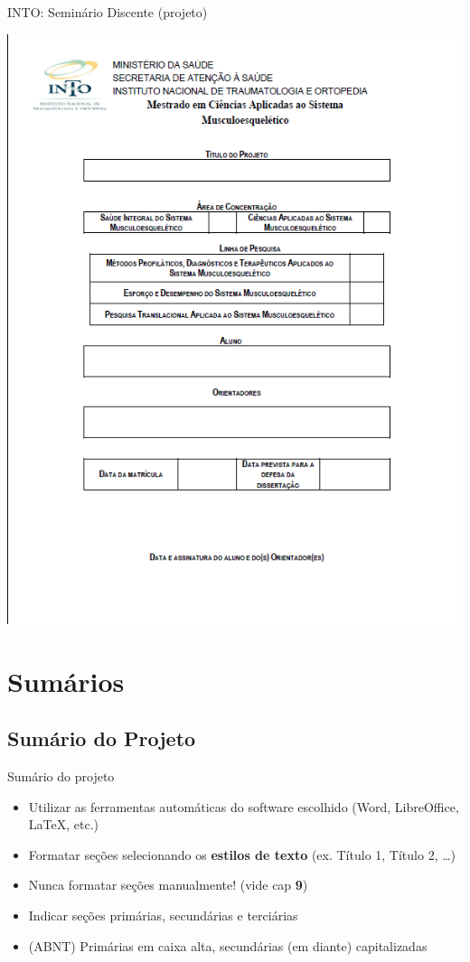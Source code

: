 \documentclass{beamer}
\begin{document}
\begin{frame}{INTO: Seminário Discente (projeto)}
  \begin{center}
    \includegraphics[height=\textheight]{ProjetoII/projeto}
  \end{center}
\end{frame}

\section{Sumários}

\subsection{Sumário do Projeto}

\begin{frame}{Sumário do projeto}
  \begin{itemize}
  \item Utilizar as ferramentas automáticas do software escolhido
    (Word, LibreOffice, \LaTeX, etc.)
  \item Formatar seções selecionando os {\bf estilos de texto}
    (ex. Título 1, Título 2, \ldots)
  \item \alert{Nunca} formatar seções manualmente! (vide cap {\bf 9})
  \item Indicar seções primárias, secundárias e terciárias
  \item (ABNT) Primárias em caixa alta, secundárias (em diante)
    capitalizadas
  \end{itemize}
\end{frame}
\end{document}
